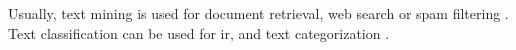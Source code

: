Usually, text mining is used for document retrieval, web search or spam filtering \cite{clusteringDocs2020}.
Text classification can be used for \ac{ir}, and text categorization \cite{tfidf2008}.